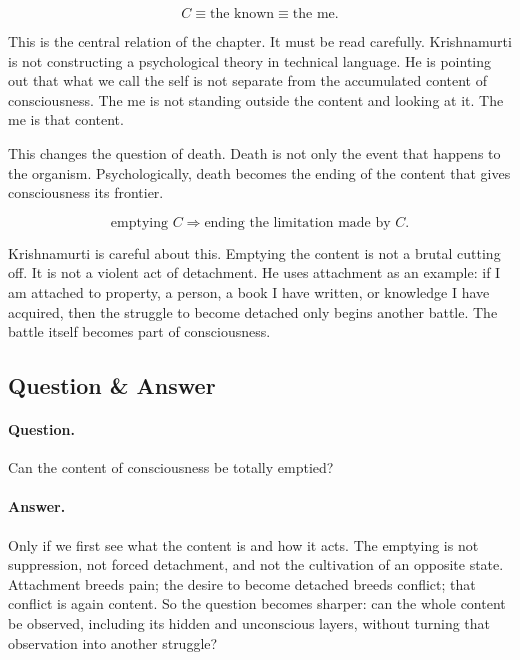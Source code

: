 \begin{equation}
C \equiv \text{the known} \equiv \text{the me}.
\end{equation}

This is the central relation of the chapter. It must be read carefully. Krishnamurti is not constructing a psychological theory in technical language. He is pointing out that what we call the self is not separate from the accumulated content of consciousness. The me is not standing outside the content and looking at it. The me is that content.

This changes the question of death. Death is not only the event that happens to the organism. Psychologically, death becomes the ending of the content that gives consciousness its frontier.

\begin{equation}
\text{emptying } C
\Rightarrow
\text{ending the limitation made by } C.
\end{equation}

Krishnamurti is careful about this. Emptying the content is not a brutal cutting off. It is not a violent act of detachment. He uses attachment as an example: if I am attached to property, a person, a book I have written, or knowledge I have acquired, then the struggle to become detached only begins another battle. The battle itself becomes part of consciousness.

\subsection{Question \& Answer}

\paragraph{Question.}
Can the content of consciousness be totally emptied?

\paragraph{Answer.}
Only if we first see what the content is and how it acts. The emptying is not suppression, not forced detachment, and not the cultivation of an opposite state. Attachment breeds pain; the desire to become detached breeds conflict; that conflict is again content. So the question becomes sharper: can the whole content be observed, including its hidden and unconscious layers, without turning that observation into another struggle?

